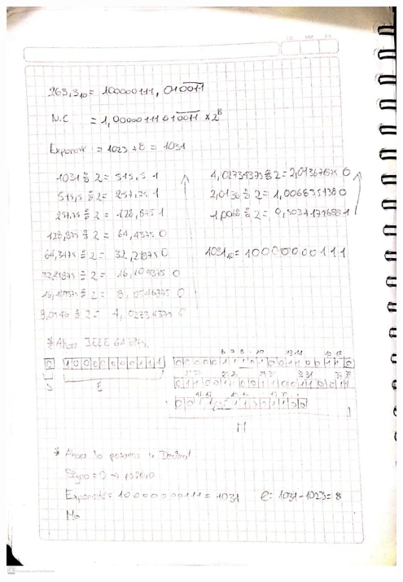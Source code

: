 \documentclass[12pt]{article}
\begin{document}
\begin{minipage}{0.95\textwidth}
    \raggedleft
    \includegraphics[width=0.95\textwidth]{inFiles/Figures/ej1.jpeg}
\end{minipage}

\vspace{0.5cm}
\end{document}
